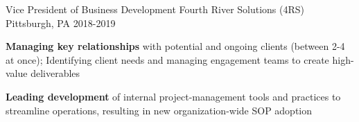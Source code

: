 \begin{cventries}
\cventry
    {Vice President of Business Development} %
    {Fourth River Solutions (4RS)} %
    {Pittsburgh, PA} %
    {2018-2019} %
    {
      \begin{cvitems} %
        \item {\textbf{Managing key relationships} with potential and ongoing clients (between 2-4 at once); Identifying client needs and managing engagement teams to create high-value deliverables}
        \item {\textbf{Leading development} of internal project-management tools and practices to streamline operations, resulting in new organization-wide SOP adoption} 
      \end{cvitems}
    }
    \vspace*{-0.2cm}

\end{cventries}
